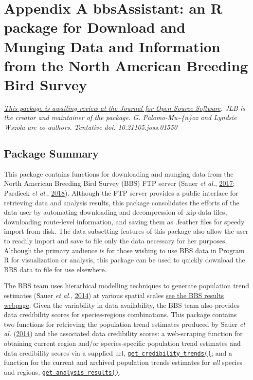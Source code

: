 \documentclass[print]{nuthesis}
\begin{document}
\hypertarget{bbsAssistant}{%
\chapter*{Appendix A bbsAssistant: an R package for Download and Munging Data and Information from the North American Breeding Bird Survey}\label{bbsAssistant}}

\emph{\href{https://github.com/openjournals/joss-papers/tree/joss.01550/joss.01550}{This package is awaiting review at the Journal for Open Source Software}. JLB is the creator and maintainer of the package. G. Palomo-Mu\textasciitilde\{n\}oz and Lyndsie Wszola are co-authors. Tentative doi: 10.21105.joss.01550}

\hypertarget{package-summary}{%
\section{Package Summary}\label{package-summary}}

This package contains functions for downloading and munging data from the North American Breeding Bird Survey (BBS) FTP server (Sauer \emph{et al.}, \protect\hyperlink{ref-sauer2017first}{2017}; Pardieck \emph{et al.}, \protect\hyperlink{ref-pardieck2018north}{2018}). Although the FTP server provides a public interface for retrieving data and analysis results, this package consolidates the efforts of the data user by automating downloading and decompression of .zip data files, downloading route-level information, and saving them as .feather files for speedy import from disk. The data subsetting features of this package also allow the user to readily import and save to file only the data necessary for her purposes. Although the primary audience is for those wishing to use BBS data in Program R for visualization or analysis, this package can be used to quickly download the BBS data to file for use elsewhere.

The BBS team uses hierarhical modelling techniques to generate population trend estimates (Sauer \emph{et al.}, \protect\hyperlink{ref-sauer2017results}{2014}) at various spatial scales \href{https://www.mbr-pwrc.usgs.gov/}{see the BBS results webpage}. Given the variability in data availability, the BBS team also provides data credibility scores for species-regions combinations. This package contains two functions for retrieving the population trend estimates produced by Sauer \emph{et al.} (\protect\hyperlink{ref-sauer2017results}{2014}) and the associated data credibility scores: a web-scraping function for obtaining current region and/or species-specific population trend estimates and data credibility scores via a supplied url, \href{https://github.com/TrashBirdEcology/bbsAssistant/blob/master/R/get_credibility_trends.R}{\texttt{get\_credibility\_trends()}}; and a function for the current and archived population trends estimates for \emph{all} species and regions, \href{https://github.com/TrashBirdEcology/bbsAssistant/blob/master/R/get_analysis_results.R}{\texttt{get\_analysis\_results()}}.
\end{document}
